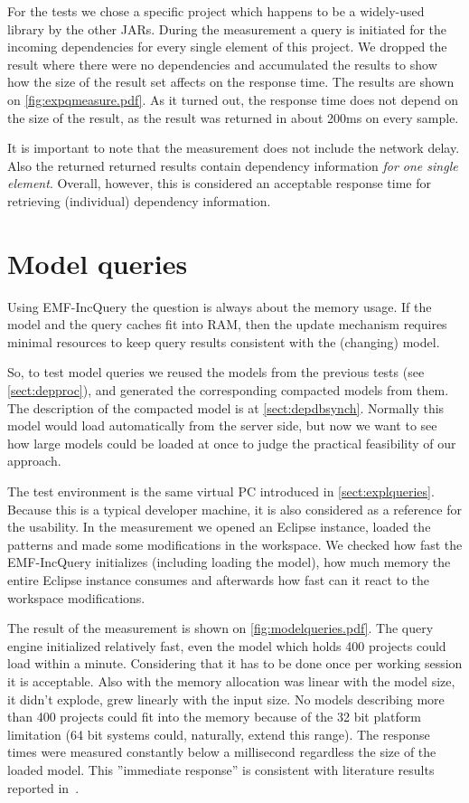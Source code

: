 For the tests we chose a specific project which happens to be a widely-used
library by the other JARs. During the measurement a query is initiated for 
the incoming dependencies for every single element of this project. 
We dropped the result where there were no dependencies and accumulated the
results to show how the size of the result set affects on the response time.
The results are shown on \autoref{fig:expqmeasure.pdf}.
As it turned out, the response time does not depend on the size of the
result, as the result was returned in about 200ms on every sample.

It is important to note that the measurement does not include the network delay.
Also the returned returned results contain dependency information \emph{for one
single element}. Overall, however, this is considered an acceptable response
time for retrieving (individual) dependency information.


\section{Model queries}
Using EMF-IncQuery the question is always about the memory usage. If the model
and the query caches fit into RAM, then the update mechanism requires minimal
resources to keep query results consistent with the (changing) model.

So, to test model queries we reused the models from the previous tests (see
\autoref{sect:depproc}), and generated the corresponding compacted models from
them.
The description of the compacted model is at \autoref{sect:depdbsynch}. Normally
this model would load automatically from the server side, but now we want to see
how large models could be loaded at once to judge the practical feasibility of
our approach.

The test environment is the same virtual PC introduced in
\autoref{sect:explqueries}. Because this is a typical developer machine, it is
also considered as a reference for the usability. In the measurement we opened
an Eclipse instance, loaded the patterns and made some modifications in the
workspace. We checked how fast the EMF-IncQuery initializes (including loading
the model), how much memory the entire Eclipse instance consumes and afterwards
how fast can it react to the workspace modifications.

The result of the measurement is shown on \autoref{fig:modelqueries.pdf}.
The query engine initialized relatively fast, even the model which holds 400
projects could load within a minute. Considering that it has to be done once per
working session it is acceptable. Also with the memory allocation was linear
with the model size, it didn't explode, grew linearly with the input size.
No models describing more than 400 projects could fit into the memory because of
the 32 bit platform limitation (64 bit systems could, naturally, extend this
range). The response times were measured constantly below a millisecond
regardless the size of the loaded model. This ''immediate response'' is
consistent with literature results reported in~\cite{MODELS10}.

